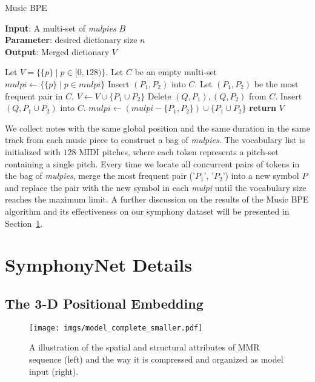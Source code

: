 \documentclass{article}
\begin{document}
\begin{algorithm}[ht]
\caption{Music BPE}
\label{alg:pimbpe}
\textbf{Input}: A multi-set of \emph{mulpies} $B$  \\
\textbf{Parameter}: desired dictionary size $n$\\
\textbf{Output}: Merged dictionary $V$ 
\begin{algorithmic}[1] \STATE Let $V = \{ \{ p \} \mid p\in[0, 128) \}$.
\STATE Let $C$ be an empty multi-set
\STATE $mulpi \gets \{ \{ p \} \mid p\in mulpi \}$
\STATE Insert $(P_1,P_2)$ into $C$.
\ENDFOR
\ENDFOR
{} \STATE Let $(P_1,P_2)$ be the most frequent pair in $C$.
\STATE $V \gets V \cup \{P_1 \cup P_2\}$ 
\STATE Delete $(Q,P_1),(Q,P_2)$ from $C$.
\STATE Insert $(Q, P_1 \cup P_2)$ into $C$.
\ENDFOR
\STATE $mulpi \gets (mulpi - \{P_1, P_2\}) \cup \{P_1 \cup P_2\}$
\ENDIF
\ENDFOR
\ENDWHILE
\STATE \textbf{return} $V$
\end{algorithmic}
\end{algorithm}
We collect notes with the same global position and the same duration in the same track from each music piece to construct a bag of \emph{mulpies}. The vocabulary list is initialized with $128$ MIDI pitches, where each token represents a pitch-set containing a single pitch. Every time we locate all concurrent pairs of tokens in the bag of \emph{mulpies}, merge the most frequent pair ('$P_1$', '$P_2$') into a new symbol $P$ and replace the pair with the new symbol in each \emph{mulpi} until the vocabulary size reaches the maximum limit. A further discussion on the results of the Music BPE algorithm and its effectiveness on our symphony dataset will be presented in Section~\ref{symphonyNet}.
\nopagebreak
\section{SymphonyNet Details} 
\label{symphonyNet}

\subsection{The 3-D Positional Embedding}
\begin{figure*}[ht]
  \centering
  \centerline{\texttt{[image: imgs/model\_complete\_smaller.pdf]}}
  \caption{A illustration of the spatial and structural attributes of MMR sequence (left) and the way it is compressed and organized as model input (right).}
  \label{fig:model}
\end{figure*}
\end{document}

